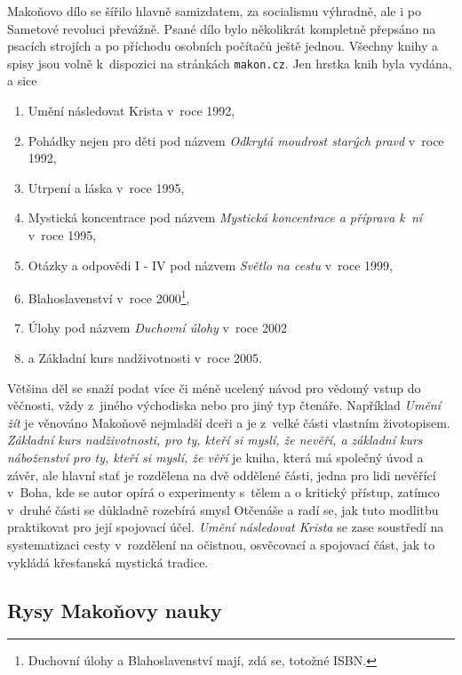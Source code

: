 Makoňovo dílo se šířilo hlavně samizdatem, za socialismu výhradně, ale i po
Sametové revoluci převážně. Psané dílo bylo několikrát kompletně přepsáno na
psacích strojích a po příchodu osobních počítačů ještě jednou. Všechny knihy a
spisy jsou volně k~dispozici na stránkách \texttt{makon.cz}. Jen hrstka knih
byla vydána, a sice
\begin{enumerate}
\item{Umění následovat Krista v~roce 1992\cite{makon1995umeni},}
\item{
    Pohádky nejen pro děti pod názvem {\em Odkrytá moudrost starých
    pravd} v~roce 1992\cite{makon1992odkryta},
}
\item{Utrpení a láska v~roce 1995\cite{makon1995utrpeni},}
\item{
    Mystická koncentrace pod názvem
    {\em Mystická koncentrace a příprava k~ní}
    v~roce 1995\cite{makon1995mysticka},
}
\item{
    Otázky a odpovědi I - IV pod názvem {\em Světlo na cestu}
    v~roce 1999\cite{makon1999svetlo},
}
\item{
    Blahoslavenství v~roce
    2000\cite{makon2000blahoslavenstvi}\footnote{\label{note1}
        Duchovní úlohy a Blahoslavenství mají, zdá se, totožné ISBN.
    },
}
\item{
    Úlohy pod názvem {\em Duchovní úlohy} v~roce
    2002\cite{makon2002ulohy}
}
\item{a Základní kurs nadživotnosti v~roce 2005\cite{makon2005zakladni}.}
\end{enumerate}

Většina děl se snaží podat více či méně ucelený návod pro vědomý vstup do
věčnosti, vždy z~jiného východiska nebo pro jiný typ čtenáře. Například {\em Umění
žít} je věnováno Makoňově nejmladší dceři a je z~velké části vlastním
životopisem. {\em Základní kurs nadživotnosti, pro ty, kteří si myslí, že nevěří, a
základní kurs náboženství pro ty, kteří si myslí, že věří} je kniha, která má
společný úvod a závěr, ale hlavní stať je rozdělena na dvě oddělené části, jedna
pro lidi nevěřící v~Boha, kde se autor opírá o experimenty s~tělem a o kritický
přístup, zatímco v~druhé části se důkladně rozebírá smysl Otčenáše a radí se,
jak tuto modlitbu praktikovat pro její spojovací účel. {\em Umění následovat
Krista} se zase soustředí na systematizaci cesty v~rozdělení na očistnou,
osvěcovací a spojovací část, jak to vykládá křesťanská mystická tradice.

\subsection{Rysy Makoňovy nauky}

